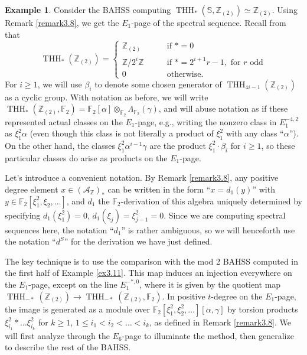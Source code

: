 \documentclass[11pt,leqno]{article}
\newcommand{\zz}{\mathbb{Z}}
\newcommand{\sss}{\mathbb{S}}
\newcommand{\mc}[1]{\mathcal{#1}}
\newcommand{\fff}{\mathbb{F}}
\DeclareMathOperator{\THH}{THH}
\newtheorem*{short hand}{theorem name}
\theoremstyle{plain}  %
\theoremstyle{definition}
\newtheorem{example}{Example}[section]
\numberwithin{equation}{section}
\begin{document}
\begin{example}\label{ex3.12} Consider the BAHSS computing $\THH_*(\sss,\zz_{(2)})\simeq\zz_{(2)}$.  Using Remark \ref{remark3.8}, we get the $E_1$-page of the spectral sequence.  Recall from \cite{bokstedt1993topological} that $$\THH_*(\zz_{(2)})=\begin{cases}
		\zz_{(2)} & \qquad \text{if }*=0\\
		\zz/2^{i}\zz & \qquad \text{if }*=2^{i+1}r-1,\text{ for }r \text{ odd}\\
		0 & \qquad \text{otherwise.}
\end{cases}$$  For $i\geq 1$, we will use $\beta_i$ to denote some chosen generator of $\THH_{4i-1}(\zz_{(2)})$ as a cyclic group.  With notation as before, we will write $\THH_*(\zz_{(2)},\fff_2)=\fff_2[\alpha]\otimes_{\fff_2}\Lambda_{\fff_2}(\gamma)$, and will abuse notation as if these represented actual classes on the $E_1$-page, e.g., writing the nonzero class in $E^{-4,2}_1$ as $\xi_1^2\alpha$ (even though this class is not literally a product of $\xi_1^2$ with any class ``$\alpha$'').  On the other hand, the classes $\xi_1^2\alpha^{i-1}\gamma$ are the product $\xi_1^2\cdot \beta_i$ for $i\geq 1$, so these particular classes do arise as products on the $E_1$-page.

Let's introduce a convenient notation.  By Remark \ref{remark3.8}, any positive degree element $x\in (\mc{A}_{\zz})_*$ can be written in the form ``$x=d_1(y)$'' with $y\in \fff_2[\xi_1^2,\xi_2,\ldots]$, and $d_1$ the $\fff_2$-derivation of this algebra uniquely determined by specifying $d_1(\xi_1^2)=0$, $d_1(\xi_{j})=\xi_{j-1}^2=0$.  Since we are computing spectral sequences here, the notation ``$d_1$'' is rather ambiguous, so we will henceforth use the notation ``$d^S$'' for the derivation we have just defined.

The key technique is to use the comparison with the mod 2 BAHSS computed in the first half of Example \ref{ex3.11}.  This map induces an injection everywhere on the $E_1$-page, except on the line $E_1^{-*,0}$, where it is given by the quotient map $\THH_{-*}(\zz_{(2)})\to \THH_{-*}(\zz_{(2)},\fff_2)$.  In positive $t$-degree on the $E_1$-page, the image is generated as a module over $\fff_2[\xi_1^2,\xi_2^2,\ldots][\alpha,\gamma]$ by torsion products $\xi_{i_1}^2*\ldots \xi_{i_k}^2$ for $k\geq 1$, $1\leq i_1<i_2<\ldots <i_k$, as defined in Remark \ref{remark3.8}.  We will first analyze through the $E_6$-page to illuminate the method, then generalize to describe the rest of the BAHSS.


\end{example}
\end{document}
